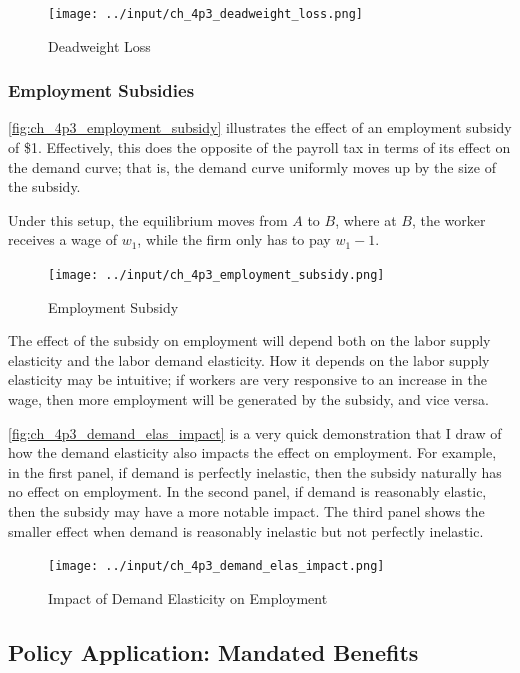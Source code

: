 \FloatBarrier

\begin{figure}[!htb]
    \centering
        \texttt{[image: ../input/ch\_4p3\_deadweight\_loss.png]}
    \caption{Deadweight Loss}
    \label{fig:ch_4p3_deadweight_loss}
\end{figure}

\FloatBarrier


\subsubsection{Employment Subsidies}

\autoref{fig:ch_4p3_employment_subsidy}
illustrates the effect of an employment subsidy of \$1.
Effectively, this does the opposite of 
the payroll tax in terms of its effect on the 
demand curve; that is, the demand curve uniformly moves up 
by the size of the subsidy.

Under this setup, the equilibrium moves from $A$ to $B$, where 
at $B$, the worker receives a wage of $w_1$, while the firm 
only has to pay $w_1 -1$.


\FloatBarrier

\begin{figure}[!htb]
    \centering
        \texttt{[image: ../input/ch\_4p3\_employment\_subsidy.png]}
    \caption{Employment Subsidy}
    \label{fig:ch_4p3_employment_subsidy}
\end{figure}

\FloatBarrier

The effect of the subsidy on employment will 
depend both on the labor supply elasticity 
and the labor demand elasticity.
How it depends on the labor supply elasticity may 
be intuitive; if workers are 
very responsive to an increase in the wage, then 
more employment will be generated by the subsidy, and 
vice versa.

\autoref{fig:ch_4p3_demand_elas_impact} is a very quick 
demonstration that I draw of how the 
demand elasticity also impacts the effect on employment.
For example, in the first panel, if demand is perfectly inelastic, then 
the subsidy naturally has no effect on employment.
In the second panel, if demand is 
reasonably elastic, then the subsidy may have a more 
notable impact. The third panel shows the 
smaller effect when demand is reasonably inelastic 
but not perfectly inelastic.


\begin{figure}[!htb]
    \centering
        \texttt{[image: ../input/ch\_4p3\_demand\_elas\_impact.png]}
    \caption{Impact of Demand Elasticity on Employment}
    \label{fig:ch_4p3_demand_elas_impact}
\end{figure}

\subsection{Policy Application: Mandated Benefits}

